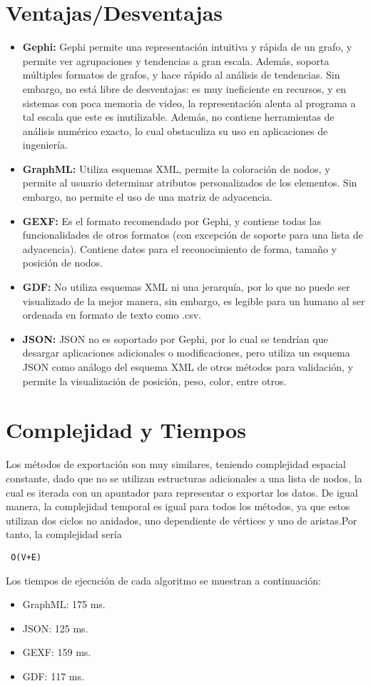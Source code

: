 \documentclass[acmsmall]{acmart}
\begin{document}
\pagebreak
\section{Ventajas/Desventajas}
\begin{itemize}

\item \textbf{Gephi:} Gephi permite una representación intuitiva y rápida de un grafo, y permite ver agrupaciones y tendencias a gran escala. Además, soporta múltiples formatos de grafos, y hace rápido al análisis de tendencias. Sin embargo, no está libre de desventajas: es muy ineficiente en recursos, y en sistemas con poca memoria de video, la representación alenta al programa a tal escala que este es inutilizable. Además, no contiene herramientas de análisis numérico exacto, lo cual obstaculiza su uso en aplicaciones de ingeniería. \cite{GephiFormat}
\item \textbf{GraphML:} Utiliza esquemas XML, permite la coloración de nodos, y permite al usuario determinar atributos personalizados de los elementos. Sin embargo, no permite el uso de una matriz de adyacencia. \cite{GraphML}
\item \textbf{GEXF:} Es el formato recomendado por Gephi, y contiene todas las funcionalidades de otros formatos (con excepción de soporte para una lista de adyacencia). Contiene datos para el reconocimiento de forma, tamaño y posición de nodos. \cite{GEXF}
\item \textbf{GDF:} No utiliza esquemas XML ni una jerarquía, por lo que no puede ser visualizado de la mejor manera, sin embargo, es legible para un humano al ser ordenada en formato de texto como .csv. 
\item \textbf{JSON:} JSON no es soportado por Gephi, por lo cual se tendrían que desargar aplicaciones adicionales o modificaciones, pero utiliza un esquema JSON como análogo del esquema XML de otros métodos para validación, y permite la visualización de posición, peso, color, entre otros. \cite{JSON} \cite{GraphML}
\end{itemize}
\section{Complejidad y Tiempos}

Los métodos de exportación son muy similares, teniendo complejidad espacial constante, dado que no se utilizan estructuras adicionales a una lista de nodos, la cual es iterada con un apuntador para representar o exportar los datos.
De igual manera, la complejidad temporal es igual para todos los métodos, ya que estos utilizan dos ciclos no anidados, uno dependiente de vértices y uno de aristas.Por tanto, la complejidad sería \begin{verbatim} O(V+E) \end{verbatim}
Los tiempos de ejecución de cada algoritmo se muestran a continuación:
\begin{itemize}
\item GraphML: 175 ms.
\item JSON: 125 ms.
\item GEXF: 159 ms.
\item GDF: 117 ms.
\end{itemize}
\end{document}
